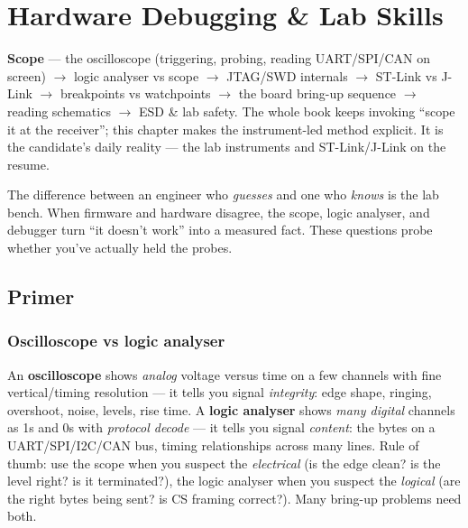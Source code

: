 
\chapter{Hardware Debugging \& Lab Skills}
\label{ch:debugging-lab}

\begin{partnote}
\textbf{Scope} --- the oscilloscope (triggering, probing, reading UART/SPI/CAN
on screen) $\rightarrow$ logic analyser vs scope $\rightarrow$ JTAG/SWD
internals $\rightarrow$ ST-Link vs J-Link $\rightarrow$ breakpoints vs
watchpoints $\rightarrow$ the board bring-up sequence $\rightarrow$ reading
schematics $\rightarrow$ ESD \& lab safety. The whole book keeps invoking
``scope it at the receiver''; this chapter makes the instrument-led method
explicit. It is the candidate's daily reality --- the lab instruments and
ST-Link/J-Link on the resume.
\end{partnote}

The difference between an engineer who \emph{guesses} and one who \emph{knows} is
the lab bench. When firmware and hardware disagree, the scope, logic analyser,
and debugger turn ``it doesn't work'' into a measured fact. These questions probe
whether you've actually held the probes.

\section{Primer}

\subsection{Oscilloscope vs logic analyser}

An \textbf{oscilloscope} shows \emph{analog} voltage versus time on a few
channels with fine vertical/timing resolution --- it tells you signal
\emph{integrity}: edge shape, ringing, overshoot, noise, levels, rise time. A
\textbf{logic analyser} shows \emph{many digital} channels as 1s and 0s with
\emph{protocol decode} --- it tells you signal \emph{content}: the bytes on a
UART/SPI/I2C/CAN bus, timing relationships across many lines. Rule of thumb: use
the scope when you suspect the \emph{electrical} (is the edge clean? is the level
right? is it terminated?), the logic analyser when you suspect the \emph{logical}
(are the right bytes being sent? is CS framing correct?). Many bring-up problems
need both.

